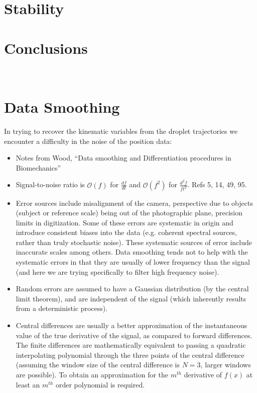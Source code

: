 \documentclass[a4paper, 12pt]{article}
\begin{document}
\section{Stability}
\section{Conclusions}
\appendix
\section{\\Data Smoothing} \label{sec.smoothing}
In trying to recover the kinematic variables from the droplet trajectories we encounter a difficulty in the noise of the position data:

\begin{itemize}
\item Notes from Wood, ``Data smoothing and Differentiation procedures in Biomechanics''

\item Signal-to-noise ratio is $\mathcal{O}(f)$ for $\frac{df}{dt}$ and $\mathcal{O}(f^2)$ for $\frac{d^2f}{ft^2}$. Refs 5, 14, 49, 95.

\item Error sources include misalignment of the camera, perspective due to objects (subject or reference scale) being out of the photographic plane, precision limits in digitization. Some of these errors are systematic in origin and introduce consistent biases into the data (e.g. coherent spectral sources, rather than truly stochastic noise). These systematic sources of error include inaccurate scales among others. Data smoothing tends not to help with the systematic errors in that they are usually of lower frequency than the signal (and here we are trying specifically to filter high frequency noise).

\item Random errors are assumed to have a Gaussian distribution (by the central limit theorem), and are independent of the signal (which inherently results from a deterministic process).

\item Central differences are usually a better approximation of the instantaneous value of the true derivative of the signal, as compared to forward differences. The finite differences are mathematically equivalent to passing a quadratic interpolating polynomial through the three points of the central difference (assuming the window size of the central difference is $N=3$, larger windows are possible). To obtain an approximation for the $m^{th}$ derivative of $f(x)$ at least an $m^{th}$ order polynomial is required.


\end{itemize}
\end{document}

